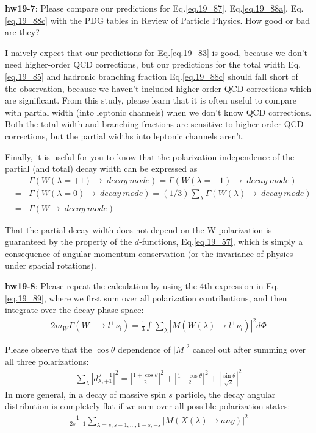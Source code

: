 \documentclass[12pt]{article}
\def\lmd{\lambda}
\begin{document}
{\bf hw19-7}: Please compare our predictions for Eq.\ref{eq.19_87}, Eq.\ref{eq.19_88a}, Eq.\ref{eq.19_88c} with the PDG tables in Review of Particle Physics.  How good or bad are they?

I naively expect that our predictions for Eq.\ref{eq.19_83} is good, because we don't need higher-order QCD corrections, but our predictions for the
total width Eq.\ref{eq.19_85} and hadronic branching fraction Eq.\ref{eq.19_88c} should fall short of the observation, because we haven't included higher order QCD corrections which are significant. From this study, please learn that it is often useful to compare with partial width (into leptonic
channels) when we don't know QCD corrections.  Both the total width
and branching fractions are sensitive to higher order QCD corrections,
but the partial widths into leptonic channels aren't.

Finally, it is useful for you to know that the polarization
independence of the partial (and total) decay width can be
expressed as
\begin{eqnarray}
  &&\Gamma(W(\lmd=+1) \to~ decay~ mode)
  = \Gamma(W(\lmd=-1) \to~ decay~ mode)\\
  &=& \Gamma(W(\lmd= 0) \to ~decay~ mode) 
  = (1/3) \sum_\lmd \Gamma(W(\lmd) \to ~decay ~mode) \\
  &=& \Gamma(W \to ~decay~ mode) \label{eq.19_89}
\end{eqnarray}

That the partial decay width does not depend on the W polarization
is guaranteed by the property of the $d$-functions, Eq.\ref{eq.19_57}, which is
simply a consequence of angular momentum conservation (or the invariance of physics under spacial rotations).

{\bf hw19-8}: Please repeat the calculation by using the 4th expression in
Eq.\ref{eq.19_89}, where we first sum over all polarization contributions, and
then integrate over the decay phase space:
\begin{eqnarray}
  2 m_W \Gamma(W^+ \to l^+ \nu_l)
= \frac{1}{3} \int \sum_{\lambda} |M(W(\lmd)\to l^+ \nu_l)|^2  d\Phi \label{eq.19_90}
\end{eqnarray}

Please observe that the $\cos\theta$ dependence of $|M|^2$ cancel
out after summing over all three polarizations:
\begin{eqnarray}
  \sum_\lambda |d^{J=1}_{\lmd,+1}|^2
  = | \frac{1 + \cos\theta}{2}   |^2
  + | \frac{1 - \cos\theta}{2}   |^2
  + | \frac{\sin\theta}{\sqrt{2}} |^2 \label{eq.19_91}
\end{eqnarray}
In more general, in a decay of massive spin $s$ particle, the
decay angular distribution is completely flat if we sum over
all possible polarization states:
\begin{eqnarray}
  \frac{1}{2s+1} \sum_{\lmd=s,s-1,...,1-s,-s} |M(X(\lmd) \to any)|^2 \label{eq.19_92}
\end{eqnarray}
\end{document}
